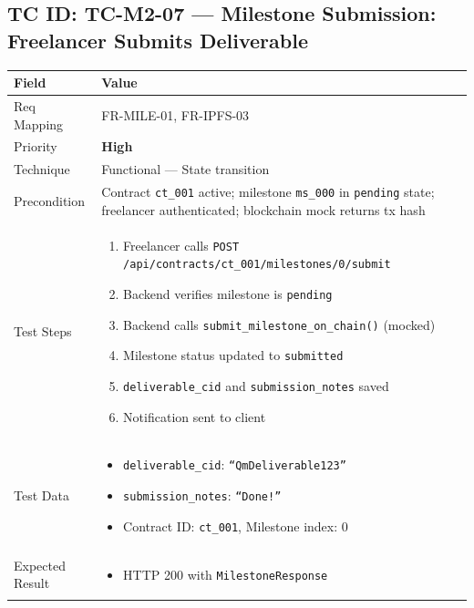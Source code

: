 \documentclass[12pt,a4paper]{article}
\newcommand{\sevhigh}{\textcolor{severityhigh}{\textbf{High}}}
\begin{document}
\vspace{0.8cm}

\subsection{TC ID: TC-M2-07 --- Milestone Submission: Freelancer Submits Deliverable}

\begin{tabular}{|p{}|p{}|}
\hline
\rowcolor{lightblue} \textbf{Field} & \textbf{Value} \\
\hline
Req Mapping & FR-MILE-01, FR-IPFS-03 \\
\hline
Priority & \sevhigh \\
\hline
Technique & Functional --- State transition \\
\hline
Precondition & Contract \texttt{ct\_001} active; milestone \texttt{ms\_000} in \texttt{pending} state; freelancer authenticated; blockchain mock returns tx hash \\
\hline
Test Steps &
\begin{enumerate}[nosep, leftmargin=*]
  \item Freelancer calls \texttt{POST /api/contracts/ct\_001/milestones/0/submit}
  \item Backend verifies milestone is \texttt{pending}
  \item Backend calls \texttt{submit\_milestone\_on\_chain()} (mocked)
  \item Milestone status updated to \texttt{submitted}
  \item \texttt{deliverable\_cid} and \texttt{submission\_notes} saved
  \item Notification sent to client
\end{enumerate} \\
\hline
Test Data &
\begin{itemize}[nosep, leftmargin=*]
  \item \texttt{deliverable\_cid}: \texttt{``QmDeliverable123''}
  \item \texttt{submission\_notes}: \texttt{``Done!''}
  \item Contract ID: \texttt{ct\_001}, Milestone index: 0
\end{itemize} \\
\hline
Expected Result &
\begin{itemize}[nosep, leftmargin=*]
  \item HTTP 200 with \texttt{MilestoneResponse}

\end{itemize}
\end{tabular}
\end{document}
